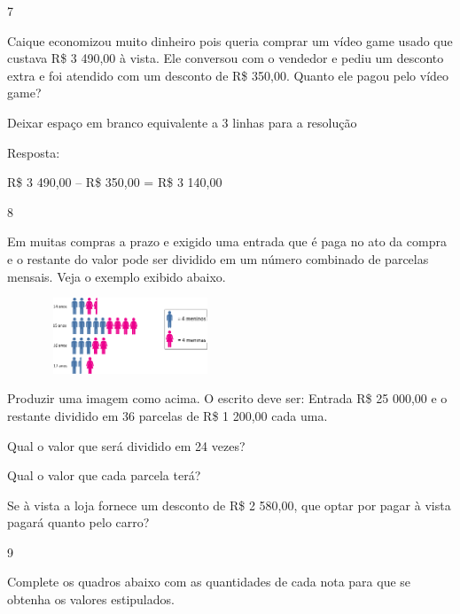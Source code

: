 \begin{escolha}
\num{7}

Caique economizou muito dinheiro pois queria comprar um vídeo game usado
que custava R\$ 3 490,00 à vista. Ele conversou com o vendedor e pediu
um desconto extra e foi atendido com um desconto de R\$ 350,00. Quanto
ele pagou pelo vídeo game?

Deixar espaço em branco equivalente a 3 linhas para a resolução

Resposta:

R\$ 3 490,00 -- R\$ 350,00 = R\$ 3 140,00

\num{8}

Em muitas compras a prazo e exigido uma entrada que é paga no ato da
compra e o restante do valor pode ser dividido em um número combinado de
parcelas mensais. Veja o exemplo exibido abaixo.

\includegraphics[width=2.90025in,height=0.89174in]{media/image76.png}

Produzir uma imagem como acima. O escrito deve ser: Entrada R\$ 25 000,00
e o restante dividido em 36 parcelas de R\$ 1 200,00 cada uma.

\begin{escolha}

\item
  Qual o valor que será dividido em 24 vezes?

\item
  Qual o valor que cada parcela terá?

\item
  Se à vista a loja fornece um desconto de R\$ 2 580,00, que optar por
  pagar à vista pagará quanto pelo carro?
\end{escolha}


\num{9}

Complete os quadros abaixo com as quantidades de cada nota para que se
obtenha os valores estipulados.


\end{escolha}
